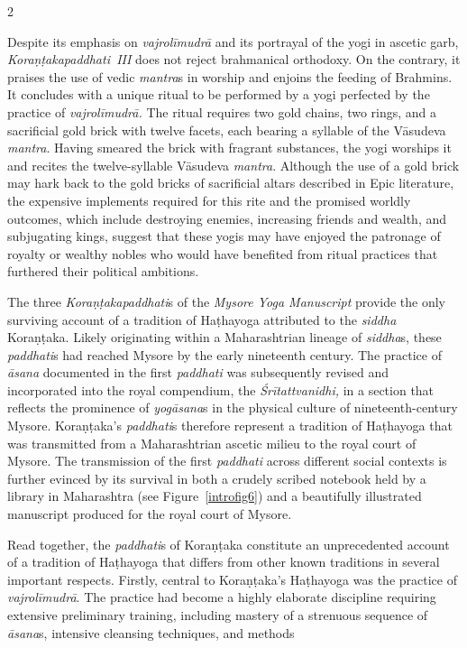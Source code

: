 \begin{nohyp}
\begin{multicols*}{2}
\begin{eng}
Despite its emphasis on \emph{vajrolīmudrā} and its portrayal of the yogi in ascetic garb, \emph{Koraṇṭakapaddhati~III} does not reject brahmanical orthodoxy. On the contrary, it praises the use of vedic \emph{mantra}s in worship and enjoins the feeding of Brahmins. It concludes with a unique ritual to be performed by a yogi perfected by the practice of \emph{vajrolīmudrā.} The ritual requires two gold chains, two rings, and a sacrificial gold brick with twelve facets, each bearing a syllable of the Vāsudeva \emph{mantra}. Having smeared the brick with fragrant substances, the yogi worships it and recites the twelve-syllable Vāsudeva \emph{mantra}. Although the use of a gold brick may hark back to the gold bricks of sacrificial altars described in Epic literature, the expensive implements required for this rite and the promised worldly outcomes, which include destroying enemies, increasing friends and wealth, and subjugating kings, suggest that these yogis may have enjoyed the patronage of royalty or wealthy nobles who would have benefited from ritual practices that furthered their political ambitions.
\vskip 18pt

\label{introsec2.5}
\vskip 9pt

\noindent
The three \emph{Koraṇṭakapaddhati}s of the \emph{Mysore Yoga Manuscript} provide the only surviving account of a tradition of Haṭhayoga attributed to the \emph{siddha} Koraṇṭaka. Likely originating within a Maharashtrian lineage of \emph{siddha}s, these \emph{paddhati}s had reached Mysore by the early nineteenth century. The practice of \emph{āsana} documented in the first \emph{paddhati} was subsequently revised and incorporated into the royal compendium, the \emph{Śrītattvanidhi,} in a section that reflects the prominence of \emph{yogāsana}s in the physical culture of nineteenth-century Mysore. Koraṇṭaka's \emph{paddhati}s therefore represent a tradition of Haṭhayoga that was transmitted from a Maharashtrian ascetic milieu to the royal court of Mysore. The transmission of the first \emph{paddhati} across different social contexts is further evinced by its survival in both a crudely scribed notebook held by a library in Maharashtra (see Figure~\ref{introfig6}) and a beautifully illustrated manuscript produced for the royal court of Mysore.


{\parfillskip=0pt
Read together, the \emph{paddhati}s of Koraṇṭaka constitute an unprecedented account of a tradition of Haṭhayoga that differs from other known traditions in several important respects. Firstly, central to Koraṇṭaka's Haṭhayoga was the practice of \emph{vajrolīmudrā}. The practice had become a highly elaborate discipline requiring extensive preliminary training, including mastery of a strenuous sequence of \emph{āsana}s, intensive cleansing techniques, and methods\par} 
\newpage
\vspace*{\fill}



\end{eng}
\end{multicols*}
\end{nohyp}
